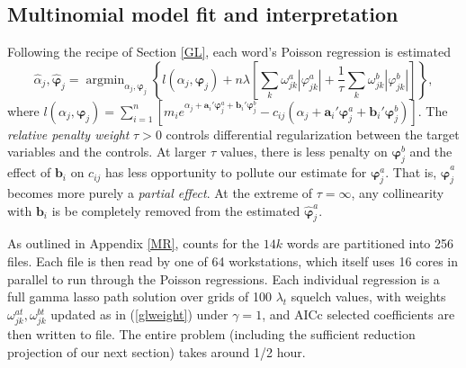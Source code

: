 \documentclass[12pt]{article}
\newcommand{\bs}[1]{\boldsymbol{#1}}
\newcommand{\bm}[1]{\mathbf{#1}}
\DeclareMathOperator*{\argmin}{argmin}
\begin{document}
\subsection{Multinomial model fit and interpretation}

Following the recipe of Section \ref{GL}, 
each word's Poisson regression is estimated 
\begin{equation}\label{yelpobj}
 \hat\alpha_j,\bs{\hat\varphi}_j = 
 \argmin_{\alpha_j,\bs{\varphi}_j} \left\{l(\alpha_j,\bs{\varphi}_j) + n \lambda \left[\sum_k \omega^a_{jk} |\varphi^a_{jk} | + \frac{1}{\tau}\sum_k \omega^b_{jk} |\varphi^b_{jk} |\right]\right\},
\end{equation}
where $l(\alpha_j, \bs{\varphi}_j) = \sum_{i=1}^n \left[ m_i e^{\alpha_j +
\bm{a}_i'\bs{\varphi}_j^a+ \bm{b}_i'\bs{\varphi}_j^b} - c_{ij}(\alpha_j +
\bm{a}_i'\bs{\varphi}_j^a+ \bm{b}_i'\bs{\varphi}_j^b)\right]$.
The {\it relative penalty weight} $\tau > 0$ controls differential
regularization between the target variables and the controls. At larger $\tau$
values, there is less penalty on $\bs{\varphi}_j^b$ and the effect of
$\bm{b}_i$ on $c_{ij}$ has less opportunity to pollute our estimate for
$\bs{\varphi}_j^a$. That is, $\bs{\hat\varphi}_j^a$ becomes more purely a {\it
partial effect}. At the extreme of $\tau = \infty$, any collinearity with
$\bm{b}_i$ is be completely removed from the estimated $\bs{\hat\varphi}_j^a$.

As outlined in Appendix \ref{MR}, counts for the $14k$ words are partitioned
into 256 files.  Each file is then read by one of 64 workstations, which
itself uses 16 cores in parallel to run through the Poisson regressions. Each
individual regression is a full gamma lasso path solution over grids of 100
$\lambda_t$ squelch values, with weights $\omega_{jk}^{at},\omega_{jk}^{bt}$
updated as in (\ref{glweight}) under $\gamma=1$, and AICc selected
coefficients are then written to file. The entire problem (including the
sufficient reduction projection of our next section) takes around 1/2 hour.
\end{document}
